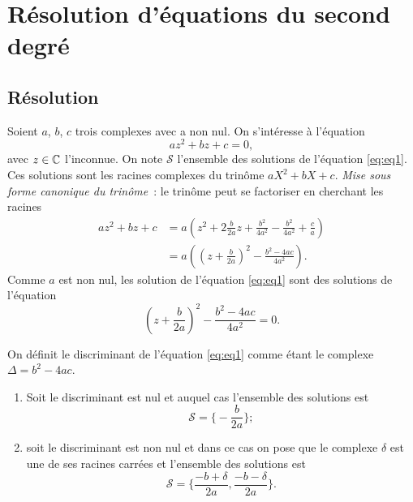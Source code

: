 \section{Résolution d'équations du second degré}
\label{sec:resolutionequationseconddegre}
\subsection{Résolution}
\label{subsec:resolution}
Soient \(a\), \(b\), \(c\) trois complexes avec a non nul. On s'intéresse à 
l'équation
\begin{equation}
    \label{eq:eq1}
    az^2+bz+c=0,
\end{equation}
avec \(z \in \mathbb{C}\) l'inconnue. On note \(\mathcal{S}\) l'ensemble des solutions 
de l'équation \eqref{eq:eq1}. Ces solutions sont les racines complexes du 
trinôme \(aX^2+bX+c\).
\emph{Mise sous forme canonique du trinôme}~: le trinôme peut se factoriser en 
cherchant les racines
\begin{align}
    az^2+bz+c &= a \left(z^2+ 2 \frac{b}{2a}z + \frac{b^2}{4a^2} - 
    \frac{b^2}{4a^2} +\frac{c}{a} \right)\\
              &=a \left( \left(z+\frac{b}{2a} \right)^2 - \frac{b^2-4ac}{4a^2} 
              \right).
\end{align}
Comme \(a\) est non nul, les solution de l'équation \eqref{eq:eq1} sont des 
solutions de l'équation
\begin{equation}
    \left(z+\frac{b}{2a} \right)^2 - \frac{b^2-4ac}{4a^2} =0.
\end{equation}
\begin{defdef}
    On définit le discriminant de l'équation \eqref{eq:eq1} comme étant le 
    complexe \(\Delta=b^2-4ac\).
\end{defdef}
\begin{enumerate}
    \item Soit le discriminant est nul et auquel cas l'ensemble des solutions 
        est
    \begin{equation}
        \mathcal{S}=\biggl\lbrace-\frac{b}{2a} \biggl\rbrace;
    \end{equation}
    \item soit le discriminant est non nul et dans ce cas on pose que le 
        complexe \(\delta\) est une de ses racines carrées et l'ensemble des 
        solutions est
    \begin{equation}
        \mathcal{S}=\biggl\lbrace \frac{-b+\delta}{2a} , \frac{-b-\delta}{2a} 
            \biggl\rbrace.
    \end{equation}
\end{enumerate}
